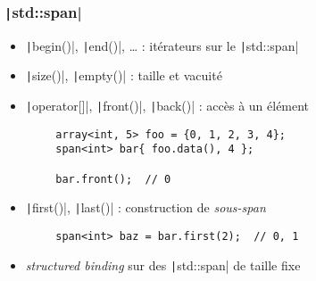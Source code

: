 \documentclass[C++.tex]{subfiles}
\begin{document}
\begin{frame}[fragile]
	\frametitle{\texttt|std::span|}
	\begin{itemize}
		\item \texttt|begin()|, \texttt|end()|, \ldots{} : itérateurs sur le \texttt|std::span|
		\item \texttt|size()|, \texttt|empty()| : taille et vacuité
		\item \texttt|operator[]|, \texttt|front()|, \texttt|back()| : accès à un élément
	\end{itemize}

	\begin{verbatim}
		array<int, 5> foo = {0, 1, 2, 3, 4};
		span<int> bar{ foo.data(), 4 };

		bar.front();  // 0
	\end{verbatim}

	\begin{itemize}
		\item \texttt|first()|, \texttt|last()| : construction de \textit{sous-span}
	\end{itemize}

	\begin{verbatim}
		span<int> baz = bar.first(2);  // 0, 1
	\end{verbatim}

	\begin{itemize}
		\item \textit{structured binding} sur des \texttt|std::span| de taille fixe
	\end{itemize}

\end{frame}
\end{document}

